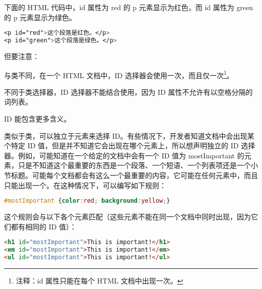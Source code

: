 下面的 HTML 代码中，id 属性为 red 的 p 元素显示为红色，而 id 属性为 green 的 p 元素显示为绿色。

\begin{lstlisting}[language=CSS]
<p id="red">这个段落是红色。</p>
<p id="green">这个段落是绿色。</p>
\end{lstlisting}

但要注意：


\begin{compactitem}
\item 与类不同，在一个 HTML 文档中，ID 选择器会使用一次，而且仅一次\footnote{注释：id 属性只能在每个 HTML 文档中出现一次。}。

\item 不同于类选择器，ID 选择器不能结合使用，因为 ID 属性不允许有以空格分隔的词列表。

\item ID 能包含更多含义。
\end{compactitem}


类似于类，可以独立于元素来选择 ID。有些情况下，开发者知道文档中会出现某个特定 ID 值，但是并不知道它会出现在哪个元素上，所以想声明独立的 ID 选择器。例如，可能知道在一个给定的文档中会有一个 ID 值为 mostImportant 的元素，只是不知道这个最重要的东西是一个段落、一个短语、一个列表项还是一个小节标题。可能每个文档都会有这么一个最重要的内容，它可能在任何元素中，而且只能出现一个。在这种情况下，可以编写如下规则：


\begin{lstlisting}[language=CSS]
#mostImportant {color:red; background:yellow;}
\end{lstlisting}

这个规则会与以下各个元素匹配（这些元素不能在同一个文档中同时出现，因为它们都有相同的 ID 值）：

\begin{lstlisting}[language=HTML]
<h1 id="mostImportant">This is important!</h1>
<em id="mostImportant">This is important!</em>
<ul id="mostImportant">This is important!</ul>
\end{lstlisting}

